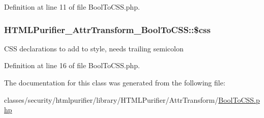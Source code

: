 Definition at line 11 of file Bool\+To\+C\+S\+S.\+php.

\hypertarget{classHTMLPurifier__AttrTransform__BoolToCSS_a782d1f9d1502c7060a84cca2bd9d3f0d}{
\subsubsection[{\$css}]{\setlength{\rightskip}{0pt plus 5cm}H\+T\+M\+L\+Purifier\+\_\+\+Attr\+Transform\+\_\+\+Bool\+To\+C\+S\+S\+::\$css\hspace{0.3cm}{\ttfamily [protected]}}}\label{classHTMLPurifier__AttrTransform__BoolToCSS_a782d1f9d1502c7060a84cca2bd9d3f0d}
C\+S\+S declarations to add to style, needs trailing semicolon 

Definition at line 16 of file Bool\+To\+C\+S\+S.\+php.



The documentation for this class was generated from the following file\+:\begin{DoxyCompactItemize}
\item 
classes/security/htmlpurifier/library/\+H\+T\+M\+L\+Purifier/\+Attr\+Transform/\hyperlink{BoolToCSS_8php}{Bool\+To\+C\+S\+S.\+php}\end{DoxyCompactItemize}
